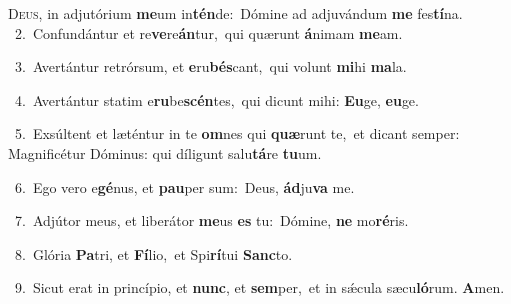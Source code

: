 \lettrine{\initial\textcolor{\initialcolor}{D}}{eus,} in adjutórium \textbf{me}\-um in\-\textbf{tén}\-de:~\star Dómine ad adjuvándum \textbf{me} fes\-\textbf{tí}\-na.\\
{\numbfont\textcolor{\numbcolor}{~2.}}~Confundántur et re\-\textbf{ve}\-re\-\textbf{án}\-tur,~\star qui quærunt \textbf{á}\-nimam \textbf{me}\-am.\par
{\numbfont\textcolor{\numbcolor}{~3.}}~Avertántur retrórsum, et \textbf{e}\-ru\-\textbf{bés}\-cant,~\star qui volunt \textbf{mi}\-hi \textbf{ma}\-la.\par
{\numbfont\textcolor{\numbcolor}{~4.}}~Avertántur statim e\-\textbf{ru}\-be\-\textbf{scén}\-tes,~\star qui dicunt mihi: \textbf{Eu}\-ge, \textbf{eu}\-ge.\par
{\numbfont\textcolor{\numbcolor}{~5.}}~Exsúltent et læténtur in te \textbf{om}\-nes qui \textbf{quæ}\-runt te,~\star et dicant semper: Magnificétur Dóminus: qui díligunt salu\-\textbf{tá}\-re \textbf{tu}\-um.\par
{\numbfont\textcolor{\numbcolor}{~6.}}~Ego vero e\-\textbf{gé}\-nus, et \textbf{pau}\-per sum:~\star Deus, \textbf{ád}\-ju\textbf{va} me.\par
{\numbfont\textcolor{\numbcolor}{~7.}}~Adjútor meus, et liberátor \textbf{me}\-us \textbf{es} tu:~\star Dómine, \textbf{ne} mo\-\textbf{ré}\-ris.\par
{\numbfont\textcolor{\numbcolor}{~8.}}~Glória \textbf{Pa}\-tri, et \textbf{Fí}\-lio,~\star et Spi\-\textbf{rí}\-tui \textbf{Sanc}\-to.\par
{\numbfont\textcolor{\numbcolor}{~9.}}~Sicut erat in princípio, et \textbf{nunc}\-, et \textbf{sem}\-per,~\star et in sǽcula sæcu\-\textbf{ló}\-rum. \textbf{A}\-men.\par
